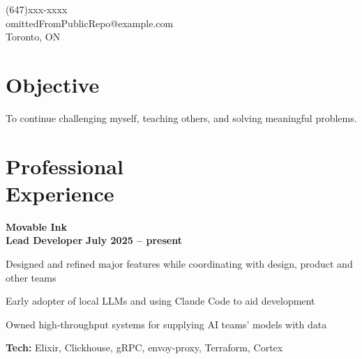 \documentclass[margin,line]{resume}
\begin{document}
\sffamily %

{
	\sc
    \hfill (647)xxx-xxxx                  \vspace{0mm}\\\vspace{0mm}
    \hfill omittedFromPublicRepo@example.com            \vspace{0mm}\\\vspace{0mm}
    \hfill Toronto, ON                \vspace{0mm}\\\vspace{-10mm}
}

\begin{resume}

\vspace{1mm}

    \section{\mysidestyle \textbf{\large{O}\small{bjective}}}

	\hspace{-3mm}To continue challenging myself, teaching others, and solving meaningful problems.

\sectionline

    \section{\mysidestyle \textbf{\large{P}\small{rofessional\\Experience}}}

    \hspace{-3mm}\textbf{\listing Movable Ink} \vspace{2mm}\\\vspace{1mm}
    \hspace{1.2mm}\textbf{Lead Developer} \hfill \textbf{July 2025 -- present}\vspace{1mm}
    \begin{list2}
        \item Designed and refined major features while coordinating with design, product and other teams
        \vspace{1mm}
        \item Early adopter of local LLMs and using Claude Code to aid development
        \vspace{1mm}
        \item Owned high-throughput systems for supplying AI teams' models with data
        \vspace{1mm}
        \item\textbf{Tech:} Elixir, Clickhouse, gRPC, envoy-proxy, Terraform, Cortex
    \end{list2}



\end{resume}
\end{document}
